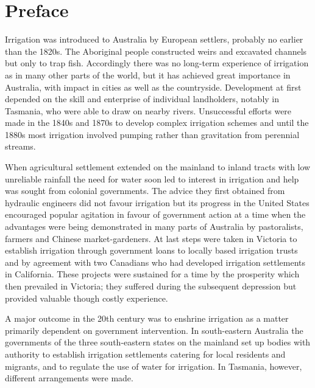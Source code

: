 
\setcounter{endnote}{0}

\chapter{Preface}
\label{ch:intro}

Irrigation was introduced to Australia by European settlers, probably
no earlier than the 1820s.  The Aboriginal people constructed weirs
and excavated channels but only to trap fish.  Accordingly there was
no long-term experience of irrigation as in many other parts of the
world, but it has achieved great importance in Australia, with impact
in cities as well as the countryside.  Development at first depended
on the skill and enterprise of individual landholders, notably in
Tasmania, who were able to draw on nearby rivers.  Unsuccessful
efforts were made in the 1840s and 1870s to develop complex irrigation
schemes and until the 1880s most irrigation involved pumping rather
than gravitation from perennial streams.

When agricultural settlement extended on the mainland to inland tracts
with low unreliable rainfall the need for water soon led to interest
in irrigation and help was sought from colonial governments.  The
advice they first obtained from hydraulic engineers did not favour
irrigation but its progress in the United States encouraged popular
agitation in favour of government action at a time when the advantages
were being demonstrated in many parts of Australia by pastoralists,
farmers and Chinese market-gardeners.  At last steps were taken in
Victoria to establish irrigation through government loans to locally
based irrigation trusts and by agreement with two Canadians who had
developed irrigation settlements in California.  These projects were
sustained for a time by the prosperity which then prevailed in
Victoria; they suffered during the subsequent depression but provided
valuable though costly experience.

A major outcome in the 20th century was to enshrine irrigation as a
matter primarily dependent on government intervention.  In
south-eastern Australia the governments of the three south-eastern
states on the mainland set up bodies with authority to establish
irrigation settlements catering for local residents and migrants, and
to regulate the use of water for irrigation.  In Tasmania, however,
different arrangements were made.

